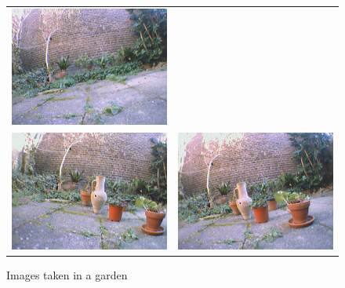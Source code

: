 \documentclass[11pt]{report}
\begin{document}
\begin{figure}[H]
\begin{tabular}{cc}
\includegraphics[scale=0.25]{images/garden2_right.png} \\
\includegraphics[scale=0.25]{images/garden3_left.png} &
\includegraphics[scale=0.25]{images/garden3_right.png} \\
\end{tabular}
\caption{Images taken in a garden}
\end{figure}
\end{document}
